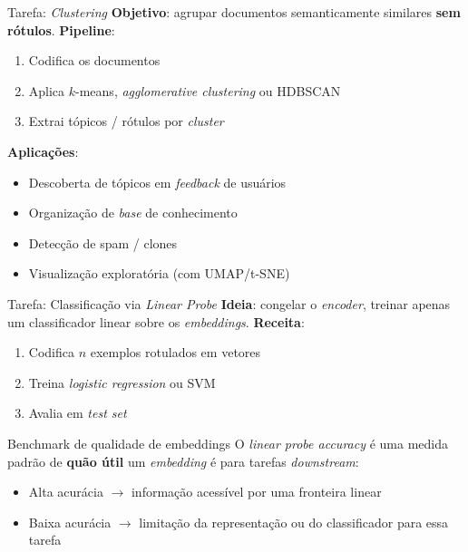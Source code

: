 \documentclass[aspectratio=169, xcolor=dvipsnames]{beamer}
\begin{document}
  \begin{frame}{Tarefa: \textit{Clustering}}
    \textbf{Objetivo}: agrupar documentos semanticamente similares \textbf{sem rótulos}.
    \textbf{Pipeline}:
    \begin{enumerate}
      \item Codifica os documentos
      \item Aplica $k$-means, \textit{agglomerative clustering} ou HDBSCAN
      \item Extrai tópicos / rótulos por \textit{cluster}
    \end{enumerate}
    \vspace{0.3em}
    \textbf{Aplicações}:
    \begin{itemize}
      \item Descoberta de tópicos em \textit{feedback} de usuários
      \item Organização de \textit{base} de conhecimento
      \item Detecção de spam / clones
      \item Visualização exploratória (com UMAP/t-SNE)
    \end{itemize}
  \end{frame}

  \begin{frame}{Tarefa: Classificação via \textit{Linear Probe}}
    \textbf{Ideia}: congelar o \textit{encoder}, treinar apenas um classificador linear sobre os \textit{embeddings}.
    \vspace{0.4em}
        \textbf{Receita}:
        \begin{enumerate}
          \item Codifica $n$ exemplos rotulados em vetores
          \item Treina \textit{logistic regression} ou SVM
          \item Avalia em \textit{test set}
        \end{enumerate}
        \vspace{0.3em}
        \begin{block}{Benchmark de qualidade de embeddings}
          O \textit{linear probe accuracy} é uma medida padrão de \textbf{quão útil} um \textit{embedding} é para tarefas \textit{downstream}:
          \begin{itemize}
            \item Alta acurácia $\to$ informação acessível por uma fronteira linear
            \item Baixa acurácia $\to$ limitação da representação ou do classificador para essa tarefa
          \end{itemize}
        \end{block}
  \end{frame}
\end{document}

